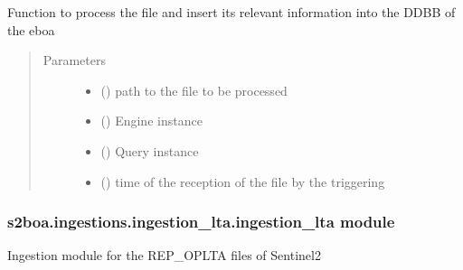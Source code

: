 \begin{fulllineitems}
\label{\detokenize{s2boa.ingestions:s2boa.ingestions.ingestion_edrs_acquisition.ingestion_edrs_acquisition.process_file}}
Function to process the file and insert its relevant information
into the DDBB of the eboa
\begin{quote}\begin{description}
\item[{Parameters}] \leavevmode\begin{itemize}
\item {} 
 () \textendash{} path to the file to be processed

\item {} 
 () \textendash{} Engine instance

\item {} 
 () \textendash{} Query instance

\item {} 
 () \textendash{} time of the reception of the file by the triggering

\end{itemize}

\end{description}\end{quote}

\end{fulllineitems}



\subsubsection{s2boa.ingestions.ingestion\_lta.ingestion\_lta module}
\label{\detokenize{s2boa.ingestions:module-s2boa.ingestions.ingestion_lta.ingestion_lta}}\label{\detokenize{s2boa.ingestions:s2boa-ingestions-ingestion-lta-ingestion-lta-module}}
Ingestion module for the REP\_OPLTA files of Sentinel\sphinxhyphen{}2

